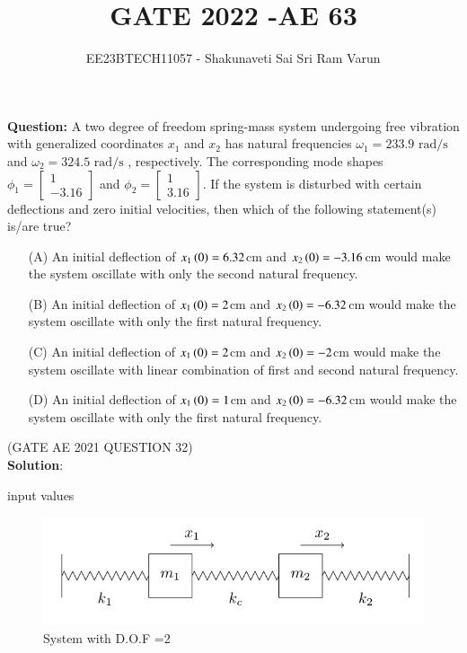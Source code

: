 \documentclass[journal,12pt,twocolumn]{IEEEtran}
\theoremstyle{remark}
\begin{document}

\vspace{3cm}

\title{GATE 2022  -AE 63}
\author{EE23BTECH11057 - Shakunaveti Sai Sri Ram Varun$^{}$%
}
\maketitle
\newpage
\bigskip
\vspace{2cm}
\textbf{Question: }
A two degree of freedom spring-mass system undergoing free vibration
with generalized coordinates $ x_1$ and $ x_2$ has natural frequencies $ \omega_1=233.9\text{ rad/s}$ and $ \omega_2 = 324.5\text{ rad/s}$ , respectively. The corresponding mode shapes $ \phi_1=\begin{bmatrix}
1\\
-3.16
\end{bmatrix}$ and $ \phi_2=\begin{bmatrix}
1\\
3.16\end{bmatrix}$. If the system is disturbed with certain
deflections and zero initial velocities, then which of the following
statement(s) is/are true?


\begin{enumerate}
    \item[(A)] An initial deflection of $ x_1\left(0\right)=6.32$cm and $ x_2\left(0\right)=-3.16$cm would make the system oscillate with only the second natural frequency.
    \item[(B)]An initial deflection of $ x_1\left(0\right)=2$cm and $ x_2\left(0\right)=-6.32$cm would make the system oscillate with only the first natural frequency.
    \item[(C)] An initial deflection of $ x_1\left(0\right)=2$cm and $ x_2\left(0\right)=-2$cm would make the system oscillate with linear combination of first and second natural frequency.
    \item[(D)] An initial deflection of $ x_1\left(0\right)=1$cm and $ x_2\left(0\right)=-6.32$cm would make the system oscillate with only the first natural frequency.
\end{enumerate}
\hfill(GATE AE 2021 QUESTION 32)\\
\textbf{Solution}:\\
\begin{table}[h!] 
\centering

\caption{input values}
\label{tab: Table2021_ae_32_1}
\end{table}
\begin{figure}[h!]
    \includegraphics[width = \columnwidth]{figs/qn_fig.png}
    \caption{System with D.O.F =2}
    \centering
    \label{fig: ae_32_`1_fig}
\end{figure}
\end{document}
